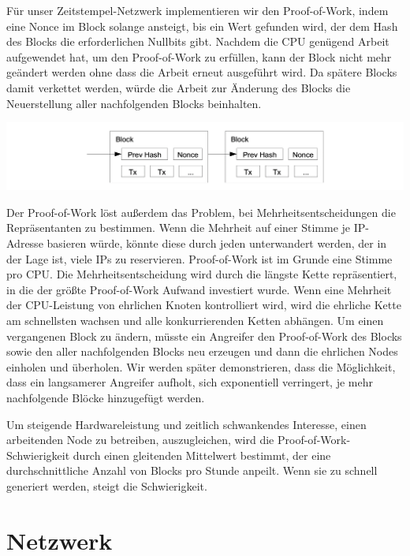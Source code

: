 \documentclass[10pt]{article}
\begin{document}
	Für unser Zeitstempel-Netzwerk implementieren wir den Proof-of-Work, indem eine Nonce im Block solange ansteigt, bis ein Wert gefunden wird, der dem Hash des Blocks die erforderlichen Nullbits gibt. Nachdem die CPU genügend Arbeit aufgewendet hat, um den Proof-of-Work zu erfüllen, kann der Block nicht mehr geändert werden ohne dass die Arbeit erneut ausgeführt wird. Da spätere Blocks damit verkettet werden, würde die Arbeit zur Änderung des Blocks die Neuerstellung aller nachfolgenden Blocks beinhalten.
	
	\begin{center}
		\includegraphics[scale=0.3]{pics/proofofwork.png}	
	\end{center}
	
	Der Proof-of-Work löst außerdem das Problem, bei Mehrheitsentscheidungen die Repräsentanten zu bestimmen. Wenn die Mehrheit auf einer Stimme je IP-Adresse basieren würde, könnte diese durch jeden unterwandert werden, der in der Lage ist, viele IPs zu reservieren. Proof-of-Work ist im Grunde eine Stimme pro CPU. Die Mehrheitsentscheidung wird durch die längste Kette repräsentiert, in die der größte Proof-of-Work Aufwand investiert wurde. Wenn eine Mehrheit der CPU-Leistung von ehrlichen Knoten kontrolliert wird, wird die ehrliche Kette am schnellsten wachsen und alle konkurrierenden Ketten abhängen. Um einen vergangenen Block zu ändern, müsste ein Angreifer den Proof-of-Work des Blocks sowie den aller nachfolgenden Blocks neu erzeugen und dann die ehrlichen Nodes einholen und überholen. Wir werden später demonstrieren, dass die Möglichkeit, dass ein langsamerer Angreifer aufholt, sich exponentiell verringert, je mehr nachfolgende Blöcke hinzugefügt werden.

	Um steigende Hardwareleistung und zeitlich schwankendes Interesse, einen arbeitenden Node zu betreiben, auszugleichen, wird die Proof-of-Work-Schwierigkeit durch einen gleitenden Mittelwert bestimmt, der eine durchschnittliche Anzahl von Blocks pro Stunde anpeilt. Wenn sie zu schnell generiert werden, steigt die Schwierigkeit.
	
	\section{Netzwerk}
	
\end{document}
